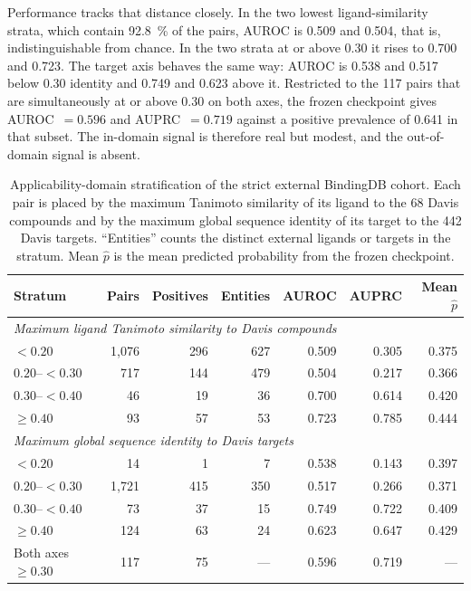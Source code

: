 \documentclass[fleqn,10pt]{wlscirep}
\begin{document}
Performance tracks that distance closely.  In the two lowest ligand-similarity
strata, which contain \SI{92.8}{\percent} of the pairs, AUROC is 0.509 and
0.504, that is, indistinguishable from chance.  In the two strata at or above
0.30 it rises to 0.700 and 0.723.  The target axis behaves the same way: AUROC
is 0.538 and 0.517 below 0.30 identity and 0.749 and 0.623 above it.  Restricted
to the 117 pairs that are simultaneously at or above 0.30 on both axes, the
frozen checkpoint gives AUROC~$=0.596$ and AUPRC~$=0.719$ against a positive
prevalence of 0.641 in that subset.  The in-domain signal is therefore real but
modest, and the out-of-domain signal is absent.

\begin{table}[htbp]
\centering
\small
\caption{Applicability-domain stratification of the strict external BindingDB
  cohort. Each pair is placed by the maximum Tanimoto similarity of its ligand
  to the 68 Davis compounds and by the maximum global sequence identity of its
  target to the 442 Davis targets. ``Entities'' counts the distinct external
  ligands or targets in the stratum. Mean $\hat{p}$ is the mean predicted
  probability from the frozen checkpoint.}
\label{tab:applicability}
\begin{tabular}{lrrrrrr}
\toprule
\textbf{Stratum} & \textbf{Pairs} & \textbf{Positives} & \textbf{Entities} &
\textbf{AUROC} & \textbf{AUPRC} & \textbf{Mean $\hat{p}$} \\
\midrule
\multicolumn{7}{l}{\emph{Maximum ligand Tanimoto similarity to Davis compounds}} \\
$<0.20$          & 1{,}076 & 296 & 627 & 0.509 & 0.305 & 0.375 \\
$0.20$--$<0.30$  &    717 & 144 & 479 & 0.504 & 0.217 & 0.366 \\
$0.30$--$<0.40$  &     46 &  19 &  36 & 0.700 & 0.614 & 0.420 \\
$\geq 0.40$      &     93 &  57 &  53 & 0.723 & 0.785 & 0.444 \\
\midrule
\multicolumn{7}{l}{\emph{Maximum global sequence identity to Davis targets}} \\
$<0.20$          &     14 &   1 &   7 & 0.538 & 0.143 & 0.397 \\
$0.20$--$<0.30$  & 1{,}721 & 415 & 350 & 0.517 & 0.266 & 0.371 \\
$0.30$--$<0.40$  &     73 &  37 &  15 & 0.749 & 0.722 & 0.409 \\
$\geq 0.40$      &    124 &  63 &  24 & 0.623 & 0.647 & 0.429 \\
\midrule
Both axes $\geq 0.30$ & 117 & 75 & --- & 0.596 & 0.719 & --- \\
\bottomrule
\end{tabular}
\end{table}
\end{document}
